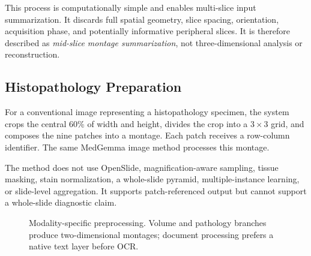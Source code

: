 \documentclass[conference]{IEEEtran}
\begin{document}
This process is computationally simple and enables multi-slice input summarization. It discards full spatial geometry, slice spacing, orientation, acquisition phase, and potentially informative peripheral slices. It is therefore described as \emph{mid-slice montage summarization}, not three-dimensional analysis or reconstruction.

\subsection{Histopathology Preparation}

For a conventional image representing a histopathology specimen, the system crops the central 60\% of width and height, divides the crop into a \(3\times3\) grid, and composes the nine patches into a montage. Each patch receives a row-column identifier. The same MedGemma image method processes this montage.

The method does not use OpenSlide, magnification-aware sampling, tissue masking, stain normalization, a whole-slide pyramid, multiple-instance learning, or slide-level aggregation. It supports patch-referenced output but cannot support a whole-slide diagnostic claim.

\begin{figure}[t]
\centering
{}
\caption{Modality-specific preprocessing. Volume and pathology branches produce two-dimensional montages; document processing prefers a native text layer before OCR.}
\label{fig:preprocessing}
\end{figure}
\end{document}
